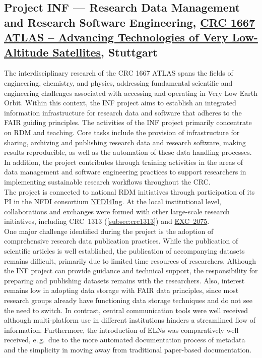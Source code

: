 \documentclass{eceasst}
\newcommand{\eg}{e.\,g.}
\begin{document}
\subsection{Project INF --- Research Data Management and Research Software Engineering, \href{https://gepris.dfg.de/gepris/projekt/516238647?language=en}{CRC 1667 ATLAS -- Advancing Technologies of Very Low-Altitude Satellites}, Stuttgart}
The interdisciplinary research of the CRC 1667 ATLAS spans the fields of engineering, chemistry, and physics, addressing fundamental scientific and engineering challenges associated with accessing and operating in Very Low Earth Orbit.
Within this context, the INF project aims to establish an integrated information infrastructure for research data and software that adheres to the FAIR guiding principles.
The activities of the INF project primarily concentrate on RDM and teaching.
Core tasks include the provision of infrastructure for sharing, archiving and publishing research data and research software, making results reproducible, as well as the automation of these data handling processes.
In addition, the project contributes through training activities in the areas of data management and software engineering practices to support researchers in implementing sustainable research workflows throughout the CRC.\\
The project is connected to national RDM initiatives through participation of its PI in the NFDI consortium \href{https://nfdi4ing.de/}{NFDI4Ing}.
At the local institutional level, collaborations and exchanges were formed with other large-scale research initiatives, including CRC~1313 (\autoref{subsec:crc1313}) and \href{https://www.simtech.uni-stuttgart.de/exc/}{EXC~2075}.\\
One major challenge identified during the project is the adoption of comprehensive research data publication practices.
While the publication of scientific articles is well established, the publication of accompanying datasets remains difficult, primarily due to limited time resources of researchers.
Although the INF project can provide guidance and technical support, the responsibility for preparing and publishing datasets remains with the researchers.
Also, interest remains low in adopting data storage with FAIR data principles, since most research groups already have functioning data storage techniques and do not see the need to switch.
In contrast, central communication tools were well received although multi-platform use in different institutions hinders a streamlined flow of information.
Furthermore, the introduction of ELNs was comparatively well received, \eg~due to the more automated documentation process of metadata and the simplicity in moving away from traditional paper-based documentation.
\end{document}
